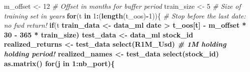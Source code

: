 \documentclass[]{krantz}
\makeatletter
\newenvironment{Shaded}{\begin{snugshade}}{\end{snugshade}}
\newcommand{\CommentTok}[1]{\textcolor[rgb]{0.37,0.37,0.37}{\textit{#1}}}
\newcommand{\ControlFlowTok}[1]{\textcolor[rgb]{0.27,0.27,0.27}{\textbf{#1}}}
\newcommand{\DecValTok}[1]{\textcolor[rgb]{0.06,0.06,0.06}{#1}}
\newcommand{\KeywordTok}[1]{\textcolor[rgb]{0.27,0.27,0.27}{\textbf{#1}}}
\newcommand{\NormalTok}[1]{#1}
\newcommand{\OperatorTok}[1]{\textcolor[rgb]{0.43,0.43,0.43}{\textbf{#1}}}
\newcommand{\StringTok}[1]{\textcolor[rgb]{0.5,0.5,0.5}{#1}}
\newenvironment{kframe}{%
\medskip{}
\setlength{\fboxsep}{.8em}
 \def\at@end@of@kframe{}%
 \ifinner\ifhmode%
  \def\at@end@of@kframe{\end{minipage}}%
  \begin{minipage}{\columnwidth}%
 \fi\fi%
 \def\FrameCommand##1{\hskip\@totalleftmargin \hskip-\fboxsep
 \colorbox{shadecolor}{##1}\hskip-\fboxsep
     \hskip-\linewidth \hskip-\@totalleftmargin \hskip\columnwidth}%
 \MakeFramed {\advance\hsize-\width
   \@totalleftmargin\z@ \linewidth\hsize
   \@setminipage}}%
 {\par\unskip\endMakeFramed%
 \at@end@of@kframe}
\renewenvironment{Shaded}{\begin{kframe}}{\end{kframe}}
\theoremstyle{definition}
\theoremstyle{definition}
\theoremstyle{definition}
\theoremstyle{remark}
\makeatother
\begin{document}
\begin{Shaded}
\begin{Highlighting}[]
\NormalTok{m_offset <-}\StringTok{ }\DecValTok{12}                                          \CommentTok{# Offset in months for buffer period}
\NormalTok{train_size <-}\StringTok{ }\DecValTok{5}                                         \CommentTok{# Size of training set in years}
\ControlFlowTok{for}\NormalTok{(t }\ControlFlowTok{in} \DecValTok{1}\OperatorTok{:}\NormalTok{(}\KeywordTok{length}\NormalTok{(t_oos)}\OperatorTok{-}\DecValTok{1}\NormalTok{))\{                          }\CommentTok{# Stop before the last date: no fwd return!}
    \ControlFlowTok{if}\NormalTok{(t}\OperatorTok{%
\NormalTok{    train_data <-}\StringTok{ }\NormalTok{data_ml }\OperatorTok{%
\NormalTok{                                    date }\OperatorTok{>}\StringTok{ }\NormalTok{t_oos[t] }\OperatorTok{-}\StringTok{ }\NormalTok{m_offset }\OperatorTok{*}\StringTok{ }\DecValTok{30} \OperatorTok{-}\StringTok{ }\DecValTok{365} \OperatorTok{*}\StringTok{ }\NormalTok{train_size)    }
\NormalTok{    test_data <-}\StringTok{ }\NormalTok{data_ml }\OperatorTok{%
\NormalTok{                                    stock_id }\OperatorTok{%
\NormalTok{    realized_returns <-}\StringTok{ }\NormalTok{test_data }\OperatorTok{%
\StringTok{        }\KeywordTok{select}\NormalTok{(R1M_Usd)                                 }\CommentTok{# 1M holding holding period!}
\NormalTok{    realized_names <-}\StringTok{ }\NormalTok{test_data }\OperatorTok{%
\StringTok{        }\KeywordTok{select}\NormalTok{(stock_id) }\OperatorTok{%
\StringTok{        }\KeywordTok{as.matrix}\NormalTok{() }
    \ControlFlowTok{for}\NormalTok{(j }\ControlFlowTok{in} \DecValTok{1}\OperatorTok{:}\NormalTok{nb_port)\{    }
}}}}}}}
\end{Highlighting}
\end{Shaded}
\end{document}
